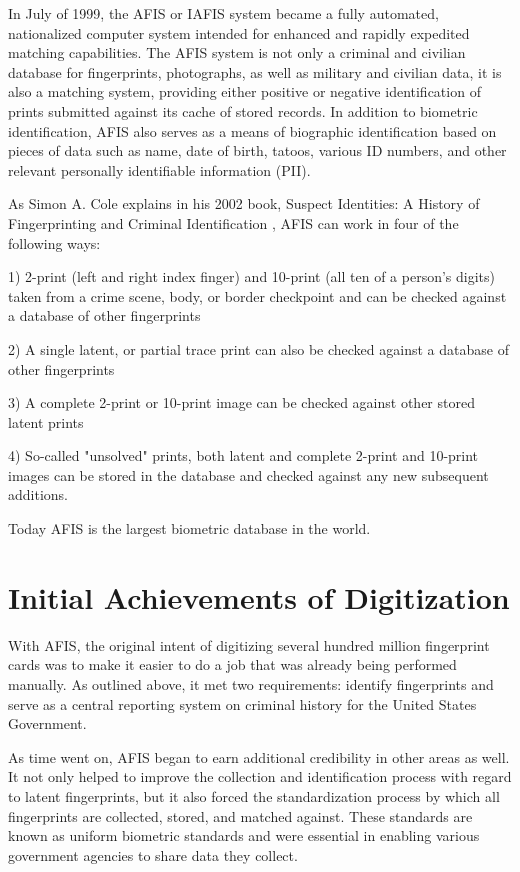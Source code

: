 \documentclass[sigconf]{acmart}
\begin{document}
In July of 1999, the AFIS or IAFIS system became a fully automated, nationalized computer system intended for enhanced and rapidly expedited matching capabilities. The AFIS system is not only a criminal and civilian database for fingerprints, photographs, as well as military and civilian data, it is also a matching system, providing either positive or negative identification of prints submitted against its cache of stored records. In addition to biometric identification, AFIS also serves as a means of biographic identification based on pieces of data such as name, date of birth, tatoos, various ID numbers, and other relevant personally identifiable information (PII). 

As Simon A. Cole explains in his 2002 book, Suspect Identities: A History of Fingerprinting and Criminal Identification \cite{Cole2002}, AFIS can work in four of the following ways:

1) 2-print (left and right index finger) and 10-print (all ten of a person's digits) taken from a crime scene, body, or border checkpoint and can be checked against a database of other fingerprints

2) A single latent, or partial trace print can also be checked against a database of other fingerprints

3) A complete 2-print or 10-print image can be checked against other stored latent prints

4) So-called "unsolved" prints, both latent and complete 2-print and 10-print images can be stored in the database and checked against any new subsequent additions.

Today AFIS is the largest biometric database in the world.

\section{Initial Achievements of Digitization}

With AFIS, the original intent of digitizing several hundred million fingerprint cards was to make it easier to do a job that was already being performed manually. As outlined above, it met two requirements: identify fingerprints and serve as a central reporting system on criminal history for the United States Government. 

As time went on, AFIS began to earn additional credibility in other areas as well. It not only helped to improve the collection and identification process with regard to latent fingerprints, but it also forced the standardization process by which all fingerprints are collected, stored, and matched against. These standards are known as uniform biometric standards and were essential in enabling various government agencies to share data they collect. 
\end{document}
